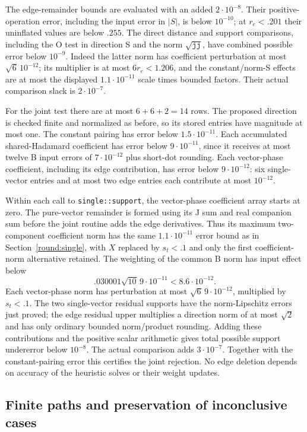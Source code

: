 The edge-remainder bounds are evaluated with an added
$2\cdot10^{-8}$.
Their positive-operation error, including the input error in $|S|$,
is below $10^{-10}$; at $r_e<.201$ their uninflated values are
below $.255$.
The direct distance and support comparisons, including the O test
in direction S and the norm $\sqrt{\mathtt{jj}}$, have combined
possible error below $10^{-9}$.
Indeed the latter norm has coefficient perturbation at most
$\sqrt6\,10^{-12}$; its multiplier is at most $6r_e<1.206$,
and the constant/norm-S effects are at most the displayed
$1.1\cdot10^{-11}$ scale times bounded factors.
Their actual comparison slack is $2\cdot10^{-7}$.

For the joint test there are at most $6+6+2=14$ rows.
The proposed direction is checked finite and normalized as before,
so its stored entries have magnitude at most one.
The constant pairing has error below $1.5\cdot10^{-11}$.
Each accumulated shared-Hadamard coefficient has error below
$9\cdot10^{-11}$, since it receives at most twelve B input errors
of $7\cdot10^{-12}$ plus short-dot rounding.
Each vector-phase coefficient, including its edge contribution,
has error below $9\cdot10^{-12}$: six single-vector entries and at
most two edge entries each contribute at most $10^{-12}$.

Within each call to \texttt{single::support}, the vector-phase
coefficient array starts at zero.  The pure-vector remainder is
formed using its J sum and real companion sum before the joint
routine adds the edge derivatives.
Thus its maximum two-component coefficient norm has the same
$1.1\cdot10^{-11}$ error bound as in
Section~\ref{round:single}, with $X$ replaced by $s_t<.1$ and only
the first coefficient-norm alternative retained.
The weighting of the common B norm has input effect below
\[
 .030001\sqrt{10}\,9\cdot10^{-11}<8.6\cdot10^{-12}.
\]
Each vector-phase norm has perturbation at most
$\sqrt6\,9\cdot10^{-12}$, multiplied by $s_t<.1$.
The two single-vector residual supports have the norm-Lipschitz
errors just proved; the edge residual upper multiplies a direction
norm of at most $\sqrt2$ and has only ordinary bounded norm/product
rounding.  Adding these contributions and the positive scalar
arithmetic gives total possible support undererror below $10^{-8}$.
The actual comparison adds $3\cdot10^{-7}$.
Together with the constant-pairing error this certifies the joint
rejection.
No edge deletion depends on accuracy of the heuristic solves or
their weight updates.

\subsection{Finite paths and preservation of inconclusive cases}
\label{round:finite}

